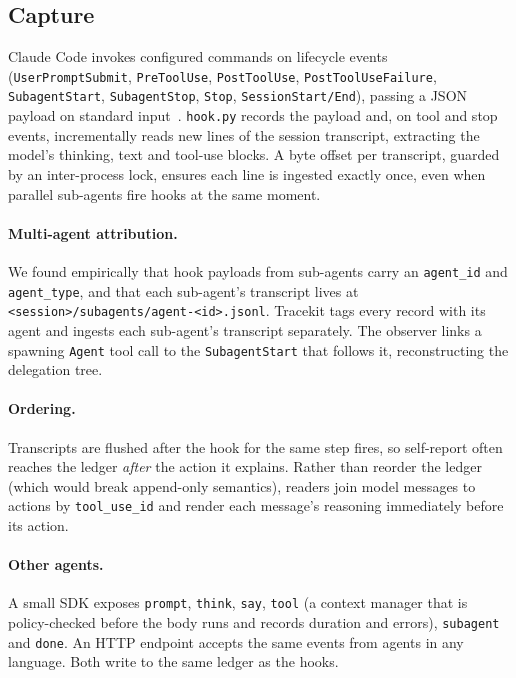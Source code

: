 \documentclass[11pt]{article}
\begin{document}
\subsection{Capture}\label{sec:capture}
Claude Code invokes configured commands on lifecycle events (\texttt{UserPromptSubmit}, \texttt{PreToolUse}, \texttt{PostToolUse}, \texttt{PostToolUseFailure}, \texttt{SubagentStart}, \texttt{SubagentStop}, \texttt{Stop}, \texttt{SessionStart/End}), passing a JSON payload on standard input~\cite{claudecode_hooks}. \texttt{hook.py} records the payload and, on tool and stop events, incrementally reads new lines of the session transcript, extracting the model's thinking, text and tool-use blocks. A byte offset per transcript, guarded by an inter-process lock, ensures each line is ingested exactly once, even when parallel sub-agents fire hooks at the same moment.

\paragraph{Multi-agent attribution.} We found empirically that hook payloads from sub-agents carry an \texttt{agent\_id} and \texttt{agent\_type}, and that each sub-agent's transcript lives at \texttt{<session>/subagents/agent-<id>.jsonl}. Tracekit tags every record with its agent and ingests each sub-agent's transcript separately. The observer links a spawning \texttt{Agent} tool call to the \texttt{SubagentStart} that follows it, reconstructing the delegation tree.

\paragraph{Ordering.} Transcripts are flushed after the hook for the same step fires, so self-report often reaches the ledger \emph{after} the action it explains. Rather than reorder the ledger (which would break append-only semantics), readers join model messages to actions by \texttt{tool\_use\_id} and render each message's reasoning immediately before its action.

\paragraph{Other agents.} A small SDK exposes \texttt{prompt}, \texttt{think}, \texttt{say}, \texttt{tool} (a context manager that is policy-checked before the body runs and records duration and errors), \texttt{subagent} and \texttt{done}. An HTTP endpoint accepts the same events from agents in any language. Both write to the same ledger as the hooks.
\end{document}
